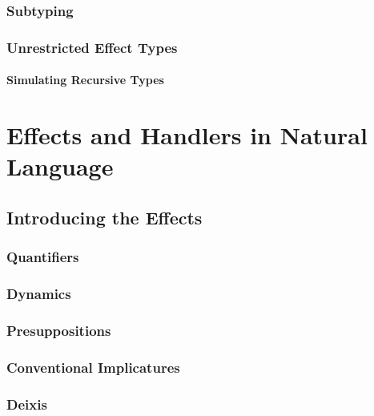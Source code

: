 \documentclass{report}
\begin{document}
\section{Subtyping}
\label{sec:subtyping}
\section{Unrestricted Effect Types}
\subsection{Simulating Recursive Types}



\part{Effects and Handlers in Natural Language}

\chapter{Introducing the Effects}
\section{Quantifiers}
\section{Dynamics}
\section{Presuppositions}
\section{Conventional Implicatures}
\section{Deixis}





\end{document}
